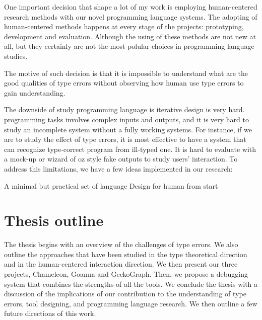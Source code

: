One important decision that shape a lot of my work is employing human-centered research methods with our novel programming language systems. The adopting of human-centered methods happens at every stage of the projects: prototyping, development and evaluation. Although the using of these methods are not new at all, but they certainly are not the most polular choices in programming language studies.

The motive of such decision is that it is impossible to understand what are the good qualities of type errors without observing how human use type errors to gain understanding. 


The downside of study programming language is iterative design is very hard. programming tasks involves complex inputs and outputs, and it is very hard to study an incomplete system without a fully working systems. For instance, if we are to study the effect of type errors, it is most effective to have a system that can recognize type-correct program from ill-typed one. It is hard to evaluate with a mock-up or wizard of oz style fake outputs to study users' interaction.  To address this limitations, we have a few ideas implemented in our research:

A minimal but practical set of language 
Design for human from start





\section{Thesis outline}

The thesis begins with an overview of the challenges of type errors. We also outline the approaches that have been studied in the type theoretical direction and in the human-centered interaction direction. We then present our three projects, Chameleon, Goanna and GeckoGraph. Then, we propose a debugging system that combines the strengths of all the tools. We conclude the thesis with a discussion of the implications of our contribution to the understanding of type errors, tool designing, and programming language research. We then outline a few future directions of this work.

